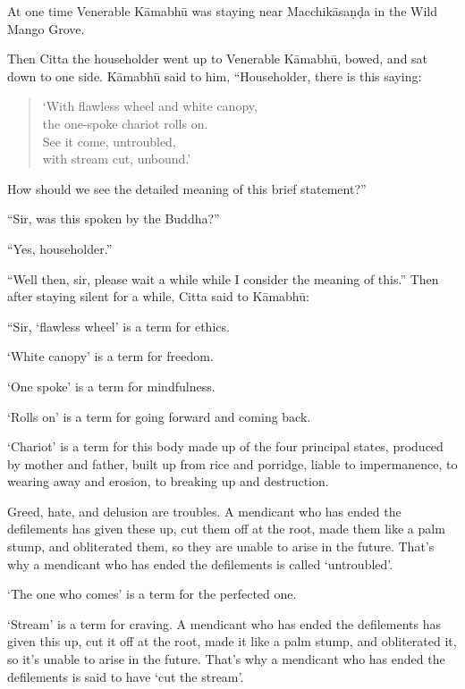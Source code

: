\documentclass[12pt,openany]{book}%
\begin{document}
At one time Venerable \textsanskrit{Kāmabhū} was staying near \textsanskrit{Macchikāsaṇḍa} in the Wild Mango Grove. 

Then Citta the householder went up to Venerable \textsanskrit{Kāmabhū}, bowed, and sat down to one side. \textsanskrit{Kāmabhū} said to him, “Householder, there is this saying: 

\begin{verse}%
‘With flawless wheel and white canopy, \\
the one-spoke chariot rolls on. \\
See it come, untroubled, \\
with stream cut, unbound.’ 

%
\end{verse}

How should we see the detailed meaning of this brief statement?” 

“Sir, was this spoken by the Buddha?” 

“Yes, householder.” 

“Well then, sir, please wait a while while I consider the meaning of this.” Then after staying silent for a while, Citta said to \textsanskrit{Kāmabhū}: 

“Sir, ‘flawless wheel’ is a term for ethics. 

‘White canopy’ is a term for freedom. 

‘One spoke’ is a term for mindfulness. 

‘Rolls on’ is a term for going forward and coming back. 

‘Chariot’ is a term for this body made up of the four principal states, produced by mother and father, built up from rice and porridge, liable to impermanence, to wearing away and erosion, to breaking up and destruction. 

Greed, hate, and delusion are troubles. A mendicant who has ended the defilements has given these up, cut them off at the root, made them like a palm stump, and obliterated them, so they are unable to arise in the future. That’s why a mendicant who has ended the defilements is called ‘untroubled’. 

‘The one who comes’ is a term for the perfected one. 

‘Stream’ is a term for craving. A mendicant who has ended the defilements has given this up, cut it off at the root, made it like a palm stump, and obliterated it, so it’s unable to arise in the future. That’s why a mendicant who has ended the defilements is said to have ‘cut the stream’. 
\end{document}
